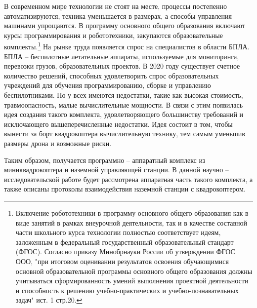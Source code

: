 В современном мире технологии не стоят на месте, процессы постепенно автоматизируются, техника уменьшается в размерах, а способы управления машинами упрощаются. В программу основного общего образования включают курсы программирования и робототехники, закупаются образовательные комплекты.\footnote{Включение робототехники в программу основного общего образования как в виде занятий в рамках внеурочной деятельности, так и в качестве составной части школьного курса технологии полностью соответствует идеям, заложенным в федеральный государственный образовательный стандарт (ФГОС). Согласно приказу Минобрнауки России об утверждении ФГОС ООО, "при итоговом оценивании результатов освоения обучающимися основной образовательной программы основного общего образования должны учитываться сформированность умений выполнения проектной деятельности и способность к решению учебно-практических и учебно-познавательных задач" ист. 1 стр.20.}
На рынке труда появляется спрос на специалистов в области БПЛА. БПЛА -- беспилотные летательные аппараты, используемые для мониторинга, перевозки грузов, образовательных проектов. В 2020 году существует счетное количество решений, способных удовлетворить спрос образовательных учреждений для обучения программированию, сборке и управлению беспилотниками. Но у всех имеются недостатки, такие как высокая стоимость, травмоопасность, малые вычислительные мощности. В связи с этим появилась идея создания такого комплекта, удовлетворяющего большинству требований и исключающего вышеперечисленные недостатки. Идея состоит в том, чтобы вынести за борт квадрокоптера вычислительную технику, тем самым уменьшив размеры дрона и возможные риски.

Таким образом, получается программно -- аппаратный комплекс из миниквадрокоптера и наземной управляющей станции. В данной научно -- исследовательской работе будет рассмотрена аппаратная часть такого комплекта, а также описаны протоколы взаимодействия наземной станции с квадрокоптером.

